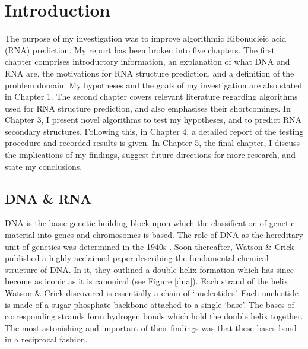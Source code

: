 \documentclass{cshonours}
\begin{document}
\tableofcontents
\listoftables  %
\listoffigures  %



\chapter{Introduction}
The purpose of my investigation was to improve algorithmic Ribonucleic acid (RNA) prediction. My report has been broken into five chapters. The first chapter comprises introductory information, an explanation of what DNA and RNA are, the motivations for RNA structure prediction, and a definition of the problem domain. My hypotheses and the goals of my investigation are also stated in Chapter 1. The second chapter covers relevant literature regarding algorithms used for RNA structure prediction, and also emphasises their shortcomings. In Chapter 3, I present novel algorithms to test my hypotheses, and to predict RNA secondary structures. Following this, in Chapter 4, a detailed report of the testing procedure and recorded results is given. In Chapter 5, the final chapter, I discuss the implications of my findings, suggest future directions for more research, and state my conclusions.

\section{DNA \& RNA}
DNA is the basic genetic building block upon which the classification of genetic material into genes and chromosomes is based. The role of DNA as the hereditary unit of genetics was determined in the 1940s \cite{albertsessential}. Soon thereafter, Watson \& Crick \cite{watson1953molecular} published a highly acclaimed paper describing the fundamental chemical structure of DNA. In it, they outlined a double helix formation which has since become as iconic as it is canonical (see Figure \ref{dna}). Each strand of the helix Watson \& Crick discovered is essentially a chain of `nucleotides'. Each nucleotide is made of a sugar-phosphate backbone attached to a single `base'. The bases of corresponding strands form hydrogen bonds which hold the double helix together. The most astonishing and important of their findings was that these bases bond in a reciprocal fashion.
\end{document}
